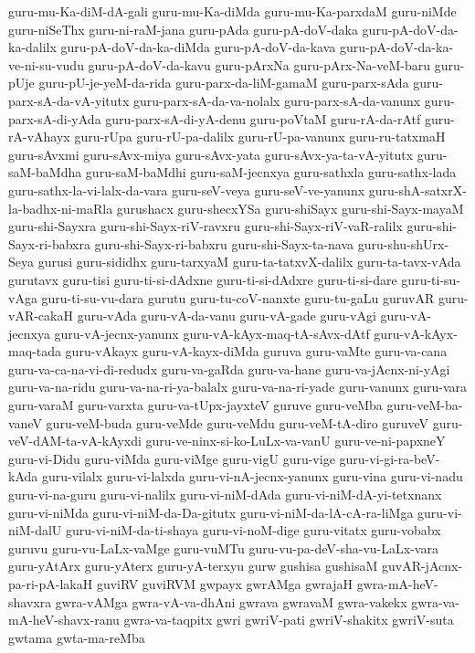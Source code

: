 {guru-mu-Ka-diM-dA-gali
guru-mu-Ka-diMda
guru-mu-Ka-parxdaM
guru-niMde
guru-niSeThx
guru-ni-raM-jana
guru-pAda
guru-pA-doV-daka
guru-pA-doV-da-ka-dalilx
guru-pA-doV-da-ka-diMda
guru-pA-doV-da-kava
guru-pA-doV-da-ka-ve-ni-su-vudu
guru-pA-doV-da-kavu
guru-pArxNa
guru-pArx-Na-veM-baru
guru-pUje
guru-pU-je-yeM-da-rida
guru-parx-da-liM-gamaM
guru-parx-sAda
guru-parx-sA-da-vA-yitutx
guru-parx-sA-da-va-nolalx
guru-parx-sA-da-vanunx
guru-parx-sA-di-yAda
guru-parx-sA-di-yA-denu
guru-poVtaM
guru-rA-da-rAtf
guru-rA-vAhayx
guru-rUpa
guru-rU-pa-dalilx
guru-rU-pa-vanunx
guru-ru-tatxmaH
guru-sAvxmi
guru-sAvx-miya
guru-sAvx-yata
guru-sAvx-ya-ta-vA-yitutx
guru-saM-baMdha
guru-saM-baMdhi
guru-saM-jecnxya
guru-sathxla
guru-sathx-lada
guru-sathx-la-vi-lalx-da-vara
guru-seV-veya
guru-seV-ve-yanunx
guru-shA-satxrX-la-badhx-ni-maRla
gurushacx
guru-shecxYSa
guru-shiSayx
guru-shi-Sayx-mayaM
guru-shi-Sayxra
guru-shi-Sayx-riV-ravxru
guru-shi-Sayx-riV-vaR-ralilx
guru-shi-Sayx-ri-babxra
guru-shi-Sayx-ri-babxru
guru-shi-Sayx-ta-nava
guru-shu-shUrx-Seya
gurusi
guru-sididhx
guru-tarxyaM
guru-ta-tatxvX-dalilx
guru-ta-tavx-vAda
gurutavx
guru-tisi
guru-ti-si-dAdxne
guru-ti-si-dAdxre
guru-ti-si-dare
guru-ti-su-vAga
guru-ti-su-vu-dara
gurutu
guru-tu-coV-nanxte
guru-tu-gaLu
guruvAR
guru-vAR-cakaH
guru-vAda
guru-vA-da-vanu
guru-vA-gade
guru-vAgi
guru-vA-jecnxya
guru-vA-jecnx-yanunx
guru-vA-kAyx-maq-tA-sAvx-dAtf
guru-vA-kAyx-maq-tada
guru-vAkayx
guru-vA-kayx-diMda
guruva
guru-vaMte
guru-va-cana
guru-va-ca-na-vi-di-redudx
guru-va-gaRda
guru-va-hane
guru-va-jAcnx-ni-yAgi
guru-va-na-ridu
guru-va-na-ri-ya-balalx
guru-va-na-ri-yade
guru-vanunx
guru-vara
guru-varaM
guru-varxta
guru-va-tUpx-jayxteV
guruve
guru-veMba
guru-veM-ba-vaneV
guru-veM-buda
guru-veMde
guru-veMdu
guru-veM-tA-diro
guruveV
guru-veV-dAM-ta-vA-kAyxdi
guru-ve-ninx-si-ko-LuLx-va-vanU
guru-ve-ni-papxneY
guru-vi-Didu
guru-viMda
guru-viMge
guru-vigU
guru-vige
guru-vi-gi-ra-beV-kAda
guru-vilalx
guru-vi-lalxda
guru-vi-nA-jecnx-yanunx
guru-vina
guru-vi-nadu
guru-vi-na-guru
guru-vi-nalilx
guru-vi-niM-dAda
guru-vi-niM-dA-yi-tetxnanx
guru-vi-niMda
guru-vi-niM-da-Da-gitutx
guru-vi-niM-da-lA-cA-ra-liMga
guru-vi-niM-dalU
guru-vi-niM-da-ti-shaya
guru-vi-noM-dige
guru-vitatx
guru-vobabx
guruvu
guru-vu-LaLx-vaMge
guru-vuMTu
guru-vu-pa-deV-sha-vu-LaLx-vara
guru-yAtArx
guru-yAterx
guru-yA-terxyu
gurw
gushisa
gushisaM
guvAR-jAcnx-pa-ri-pA-lakaH
guviRV
guviRVM
gwpayx
gwrAMga
gwrajaH
gwra-mA-heV-shavxra
gwra-vAMga
gwra-vA-va-dhAni
gwrava
gwravaM
gwra-vakekx
gwra-va-mA-heV-shavx-ranu
gwra-va-taqpitx
gwri
gwriV-pati
gwriV-shakitx
gwriV-suta
gwtama
gwta-ma-reMba
}
